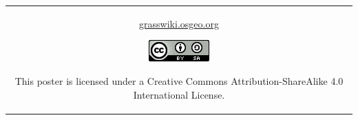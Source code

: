 \documentclass[25pt, margin=0mm, innermargin=15mm, blockverticalspace=15mm, colspace=15mm, subcolspace=8mm]{tikzposter}
\begin{document}
\begin{columns}
{\begin{center}
\begin{tabular}{c}
\begin{minipage}{0.2\linewidth}
\small {\url{grasswiki.osgeo.org}}
\end{minipage}

\begin{minipage}{0.1\linewidth}
\href{http://creativecommons.org/licenses/by-sa/4.0/}{\includegraphics[width=\textwidth]{ccbysa}}
\end{minipage}

\begin{minipage}{0.35\linewidth}
\small This poster is licensed under a Creative Commons Attribution-ShareAlike 4.0 International License.
\end{minipage}

\end{tabular}
\end{center}

}

\end{columns}
\end{document}
